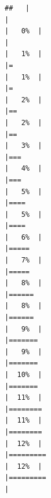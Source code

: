\documentclass[
  english,
  man,a4paper,mask,floatsintext]{apa6}
\begin{document}
\begin{verbatim}
##   |                                                                              |                                                                      |   0%  |                                                                              |                                                                      |   1%  |                                                                              |=                                                                     |   1%  |                                                                              |=                                                                     |   2%  |                                                                              |==                                                                    |   2%  |                                                                              |==                                                                    |   3%  |                                                                              |===                                                                   |   4%  |                                                                              |===                                                                   |   5%  |                                                                              |====                                                                  |   5%  |                                                                              |====                                                                  |   6%  |                                                                              |=====                                                                 |   7%  |                                                                              |=====                                                                 |   8%  |                                                                              |======                                                                |   8%  |                                                                              |======                                                                |   9%  |                                                                              |=======                                                               |   9%  |                                                                              |=======                                                               |  10%  |                                                                              |=======                                                               |  11%  |                                                                              |========                                                              |  11%  |                                                                              |========                                                              |  12%  |                                                                              |=========                                                             |  12%  |                                                                              |=========                                                             |  
\end{verbatim}
\end{document}
